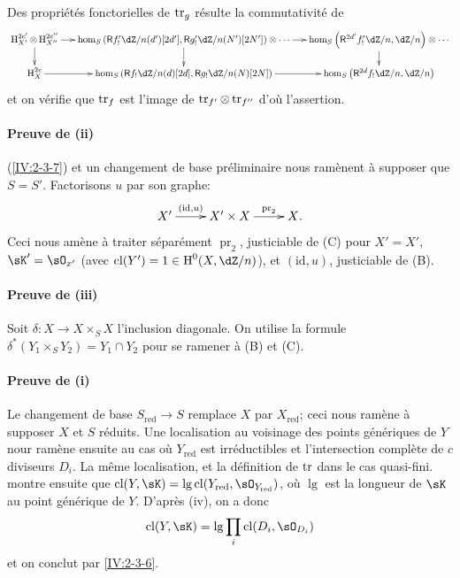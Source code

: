 Des propriétés fonctorielles de $\operatorname{tr}_g$ \cite[XVIII.2.12]{sga4} résulte 
la commutativité de 
\small
\[\xymatrix@=0.5cm{
  \h_{X'}^{2c'}\otimes \h_{X''}^{2 c''}\ar[r] \ar[d] 
    & \hom_S\left(\R f_!' \dZ/n(d')[2 d'],\R g_!'\dZ/n(N')[2 N']\right)\otimes \cdots \ar[r] \ar[d] 
    & \hom_S\left(\R^{2 d'} f_!' \dZ/n,\dZ/n\right) \otimes \cdots \ar[d] \\
  \h_X^{2 c} \ar[r] 
    & \hom_S\left(\R f_!\dZ/n(d)[2 d],\R g_!\dZ/n(N)[2 N]\right) \ar[r] 
    & \hom_S\left(\R ^{2 d}f_!\dZ/n,\dZ/n\right)
}\]
\normalsize
et on vérifie que $\operatorname{tr}_f$ est l'image de $\operatorname{tr}_{f'}\otimes \operatorname{tr}_{f''}$ d'où 
l'assertion. 

\paragraph{Preuve de (ii)}
(\ref{IV:2-3-7}) et un changement de base préliminaire nous ramènent à 
supposer que $S=S'$. Factorisons $u$ par son graphe:
\[\xymatrix{
  X' \ar[r]^-{(\text{id},u)} 
    & X'\times X \ar[r]^-{\operatorname{pr}_2} 
    & X \text{.}
}\]
Ceci nous amène à traiter séparément $\operatorname{pr}_2$, justiciable 
de (C) pour $X'=X'$, $\sK'=\sO_{x'}$ (avec $\cl(Y')=1\in \h^0(X,\dZ/n)$), et 
$(\text{id},u)$, justiciable de (B). 

\paragraph{Preuve de (iii)}
Soit $\delta:X\to X\times_S X$ l'inclusion diagonale. On utilise la formule 
$\delta^\ast(Y_1\times_S Y_2) = Y_1\cap Y_2$ pour se ramener à 
(B) et (C). 

\paragraph{Preuve de (i)}
Le changement de base $S_\text{red}\to S$ remplace $X$ par $X_\text{red}$; ceci 
nous ramène à supposer $X$ et $S$ réduits. Une localisation au voisinage 
des points génériques de $Y$ nour ramène ensuite au cas où 
$Y_\text{red}$ est irréductibles et l'intersection complète de $c$ 
diviseurs $D_i$. La même localisation, et la définition de $\operatorname{tr}$ dans le 
cas quasi-fini. montre ensuite que 
$\cl(Y,\sK)=\operatorname{lg}\cl(Y_\text{red},\sO_{Y_\text{red}})$, où 
$\operatorname{lg}$ est la longueur de $\sK$ au point générique de $Y$. 
D'après (iv), on a donc 
\[
  \cl(Y,\sK) = \operatorname{lg} \prod_i \cl(D_i,\sO_{D_i})
\]
et on conclut par \ref{IV:2-3-6}. 





